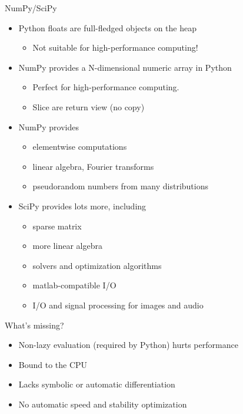 \documentclass[utf8x,xcolor=pdftex,dvipsnames,table]{beamer}
\begin{document}
\begin{frame}{NumPy/SciPy}
  \begin{itemize}
  \item Python floats are full-fledged objects on the heap
      \begin{itemize}
      \item Not suitable for high-performance computing!
      \end{itemize}

  \item NumPy provides a N-dimensional numeric array in Python
      \begin{itemize}
      \item Perfect for high-performance computing.
      \item Slice are return view (no copy)
      \end{itemize}
    
  \item NumPy provides
      \begin{itemize}
      \item elementwise computations
      \item linear algebra, Fourier transforms
      \item pseudorandom numbers from many distributions
      \end{itemize}

  \item SciPy provides lots more, including
      \begin{itemize}
      \item sparse matrix
      \item more linear algebra
      \item solvers and optimization algorithms
      \item matlab-compatible I/O
      \item I/O and signal processing for images and audio
      \end{itemize}
  \end{itemize}
\end{frame}

\begin{frame}{What's missing?}
  \begin{itemize}
    \item Non-lazy evaluation (required by Python) hurts performance
    \item Bound to the CPU
    \item Lacks symbolic or automatic differentiation
    \item No automatic speed and stability optimization
  \end{itemize}

\end{frame}
\end{document}
